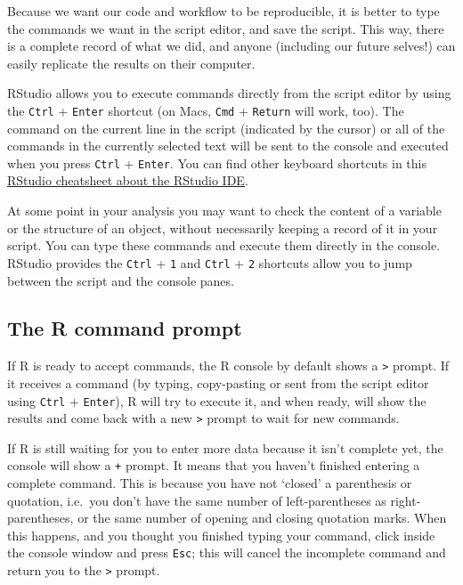 \documentclass[]{book}
\theoremstyle{definition}
\theoremstyle{definition}
\theoremstyle{remark}
\begin{document}
Because we want our code and workflow to be reproducible, it is better
to type the commands we want in the script editor, and save the script.
This way, there is a complete record of what we did, and anyone
(including our future selves!) can easily replicate the results on their
computer.

RStudio allows you to execute commands directly from the script editor
by using the \texttt{Ctrl} + \texttt{Enter} shortcut (on Macs,
\texttt{Cmd} + \texttt{Return} will work, too). The command on the
current line in the script (indicated by the cursor) or all of the
commands in the currently selected text will be sent to the console and
executed when you press \texttt{Ctrl} + \texttt{Enter}. You can find
other keyboard shortcuts in this
\href{https://github.com/rstudio/cheatsheets/blob/master/source/pdfs/rstudio-IDE-cheatsheet.pdf}{RStudio
cheatsheet about the RStudio IDE}.

At some point in your analysis you may want to check the content of a
variable or the structure of an object, without necessarily keeping a
record of it in your script. You can type these commands and execute
them directly in the console. RStudio provides the \texttt{Ctrl} +
\texttt{1} and \texttt{Ctrl} + \texttt{2} shortcuts allow you to jump
between the script and the console panes.

\subsection{The R command prompt}\label{the-r-command-prompt}

If R is ready to accept commands, the R console by default shows a
\texttt{\textgreater{}} prompt. If it receives a command (by typing,
copy-pasting or sent from the script editor using \texttt{Ctrl} +
\texttt{Enter}), R will try to execute it, and when ready, will show the
results and come back with a new \texttt{\textgreater{}} prompt to wait
for new commands.

If R is still waiting for you to enter more data because it isn't
complete yet, the console will show a \texttt{+} prompt. It means that
you haven't finished entering a complete command. This is because you
have not `closed' a parenthesis or quotation, i.e.~you don't have the
same number of left-parentheses as right-parentheses, or the same number
of opening and closing quotation marks. When this happens, and you
thought you finished typing your command, click inside the console
window and press \texttt{Esc}; this will cancel the incomplete command
and return you to the \texttt{\textgreater{}} prompt.
\end{document}
